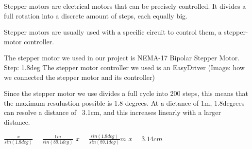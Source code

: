 Stepper motors are electrical motors that can be precisely controlled.
It divides a full rotation into a discrete amount of steps, each equally big.

Stepper motors are usually used with a specific circuit to control them, a stepper-motor controller.

The stepper motor we used in our project is NEMA-17 Bipolar Stepper Motor.
Step: 1.8deg
\cite{steppermotor}
The stepper motor controller we used is an EasyDriver
\cite{steppercontroller}
(Image: how we connected the stepper motor and its controller)

Since the stepper motor we use divides a full cycle into 200 steps, this means that the maximum resulustion possible is 1.8 degrees. At a dictance of 1m, 1.8degrees can resolve a distance of ~3.1cm, and this increases linearly with a larger distance.

$\frac{x}{sin(1.8deg)} = \frac{1m}{sin(89.1deg)}$
$x = \frac{sin(1.8deg)}{sin(89.1deg)}m$
$x = 3.14cm$
